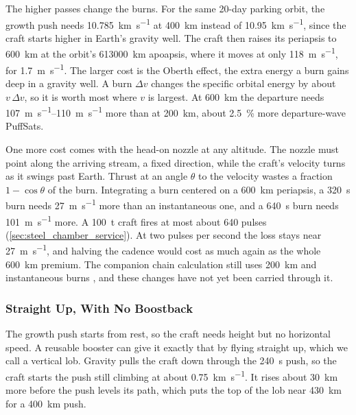 \documentclass{article}
\newcommand{\deltav}{\Delta v}
\begin{document}
The higher passes change the burns. For the same 20-day parking orbit, the growth push needs \SI{10.785}{\kilo\meter\per\second} at \SI{400}{\kilo\meter} instead of \SI{10.95}{\kilo\meter\per\second}, since the craft starts higher in Earth's gravity well. The craft then raises its periapsis to \SI{600}{\kilo\meter} at the orbit's \SI{613000}{\kilo\meter} apoapsis, where it moves at only \SI{118}{\meter\per\second}, for \SI{1.7}{\meter\per\second}. The larger cost is the Oberth effect, the extra energy a burn gains deep in a gravity well. A burn $\deltav$ changes the specific orbital energy by about $v\,\deltav$, so it is worth most where $v$ is largest. At \SI{600}{\kilo\meter} the departure needs \SIrange{107}{110}{\meter\per\second} more than at \SI{200}{\kilo\meter}, about \SI{2.5}{\percent} more departure-wave PuffSats.

One more cost comes with the head-on nozzle at any altitude. The nozzle must point along the arriving stream, a fixed direction, while the craft's velocity turns as it swings past Earth. Thrust at an angle $\theta$ to the velocity wastes a fraction $1-\cos\theta$ of the burn. Integrating a burn centered on a \SI{600}{\kilo\meter} periapsis, a \SI{320}{\second} burn needs \SI{27}{\meter\per\second} more than an instantaneous one, and a \SI{640}{\second} burn needs \SI{101}{\meter\per\second} more. A \SI{100}{\tonne} craft fires at most about 640 pulses (\autoref{sec:steel_chamber_service}). At two pulses per second the loss stays near \SI{27}{\meter\per\second}, and halving the cadence would cost as much again as the whole \SI{600}{\kilo\meter} premium. The companion chain calculation still uses \SI{200}{\kilo\meter} and instantaneous burns \cite{Katz_aim_is_all_you_need_2025}, and these changes have not yet been carried through it.

\subsubsection{Straight Up, With No Boostback}\label{sec:vertical_lob}
The growth push starts from rest, so the craft needs height but no horizontal speed. A reusable booster can give it exactly that by flying straight up, which we call a vertical lob. Gravity pulls the craft down through the \SI{240}{\second} push, so the craft starts the push still climbing at about \SI{0.75}{\kilo\meter\per\second}. It rises about \SI{30}{\kilo\meter} more before the push levels its path, which puts the top of the lob near \SI{430}{\kilo\meter} for a \SI{400}{\kilo\meter} push.
\end{document}
